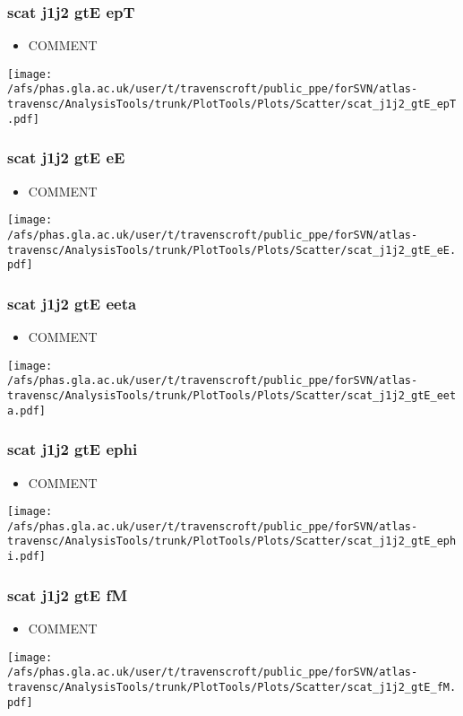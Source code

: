 \documentclass{beamer}
\begin{document}
\begin{frame}
\frametitle{scat j1j2 gtE epT}
\begin{itemize}
\item COMMENT
\end{itemize}
\begin{center}
\texttt{[image: /afs/phas.gla.ac.uk/user/t/travenscroft/public\_ppe/forSVN/atlas-travensc/AnalysisTools/trunk/PlotTools/Plots/Scatter/scat\_j1j2\_gtE\_epT.pdf]}
\end{center}
\end{frame}

\begin{frame}
\frametitle{scat j1j2 gtE eE}
\begin{itemize}
\item COMMENT
\end{itemize}
\begin{center}
\texttt{[image: /afs/phas.gla.ac.uk/user/t/travenscroft/public\_ppe/forSVN/atlas-travensc/AnalysisTools/trunk/PlotTools/Plots/Scatter/scat\_j1j2\_gtE\_eE.pdf]}
\end{center}
\end{frame}

\begin{frame}
\frametitle{scat j1j2 gtE eeta}
\begin{itemize}
\item COMMENT
\end{itemize}
\begin{center}
\texttt{[image: /afs/phas.gla.ac.uk/user/t/travenscroft/public\_ppe/forSVN/atlas-travensc/AnalysisTools/trunk/PlotTools/Plots/Scatter/scat\_j1j2\_gtE\_eeta.pdf]}
\end{center}
\end{frame}

\begin{frame}
\frametitle{scat j1j2 gtE ephi}
\begin{itemize}
\item COMMENT
\end{itemize}
\begin{center}
\texttt{[image: /afs/phas.gla.ac.uk/user/t/travenscroft/public\_ppe/forSVN/atlas-travensc/AnalysisTools/trunk/PlotTools/Plots/Scatter/scat\_j1j2\_gtE\_ephi.pdf]}
\end{center}
\end{frame}

\begin{frame}
\frametitle{scat j1j2 gtE fM}
\begin{itemize}
\item COMMENT
\end{itemize}
\begin{center}
\texttt{[image: /afs/phas.gla.ac.uk/user/t/travenscroft/public\_ppe/forSVN/atlas-travensc/AnalysisTools/trunk/PlotTools/Plots/Scatter/scat\_j1j2\_gtE\_fM.pdf]}
\end{center}
\end{frame}
\end{document}
